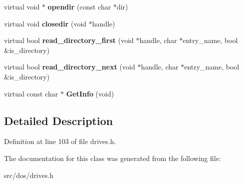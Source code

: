 \begin{DoxyCompactItemize}
\item 
\hypertarget{classphysfsDrive_a756307aafafedac089329c0e3b7505a6}{virtual void $\ast$ {\bfseries opendir} (const char $\ast$dir)}\label{classphysfsDrive_a756307aafafedac089329c0e3b7505a6}

\item 
\hypertarget{classphysfsDrive_ac84586904d9a42b12269ccbf544bc9c9}{virtual void {\bfseries closedir} (void $\ast$handle)}\label{classphysfsDrive_ac84586904d9a42b12269ccbf544bc9c9}

\item 
\hypertarget{classphysfsDrive_a4bf2acd16cce99b4dcb8c3dade56ff59}{virtual bool {\bfseries read\-\_\-directory\-\_\-first} (void $\ast$handle, char $\ast$entry\-\_\-name, bool \&is\-\_\-directory)}\label{classphysfsDrive_a4bf2acd16cce99b4dcb8c3dade56ff59}

\item 
\hypertarget{classphysfsDrive_aa238b0a78e9f4fec38032b52c09d4f3f}{virtual bool {\bfseries read\-\_\-directory\-\_\-next} (void $\ast$handle, char $\ast$entry\-\_\-name, bool \&is\-\_\-directory)}\label{classphysfsDrive_aa238b0a78e9f4fec38032b52c09d4f3f}

\item 
\hypertarget{classphysfsDrive_a072fae9f05ddcd030b6c20997b4a6a21}{virtual const char $\ast$ {\bfseries Get\-Info} (void)}\label{classphysfsDrive_a072fae9f05ddcd030b6c20997b4a6a21}

\end{DoxyCompactItemize}


\subsection{Detailed Description}


Definition at line 103 of file drives.\-h.



The documentation for this class was generated from the following file\-:\begin{DoxyCompactItemize}
\item 
src/dos/drives.\-h\end{DoxyCompactItemize}
